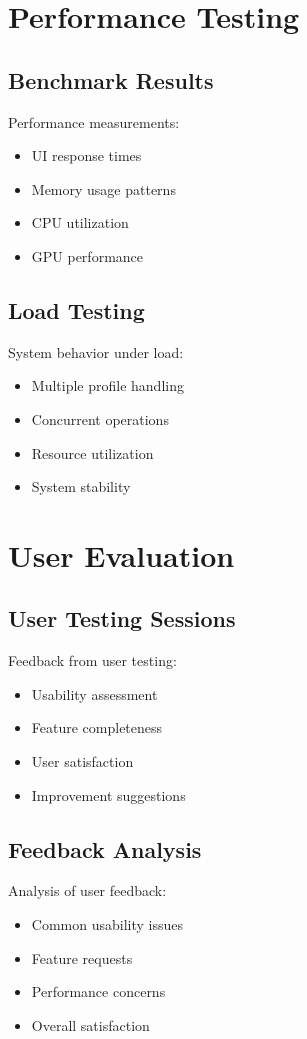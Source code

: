 \section{Performance Testing}
\subsection{Benchmark Results}
Performance measurements:
\begin{itemize}
    \item UI response times
    \item Memory usage patterns
    \item CPU utilization
    \item GPU performance
\end{itemize}

\subsection{Load Testing}
System behavior under load:
\begin{itemize}
    \item Multiple profile handling
    \item Concurrent operations
    \item Resource utilization
    \item System stability
\end{itemize}

\section{User Evaluation}
\subsection{User Testing Sessions}
Feedback from user testing:
\begin{itemize}
    \item Usability assessment
    \item Feature completeness
    \item User satisfaction
    \item Improvement suggestions
\end{itemize}

\subsection{Feedback Analysis}
Analysis of user feedback:
\begin{itemize}
    \item Common usability issues
    \item Feature requests
    \item Performance concerns
    \item Overall satisfaction
\end{itemize}

